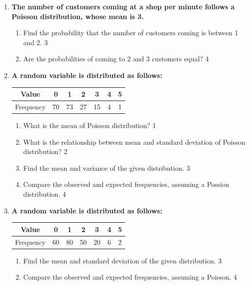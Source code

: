 \documentclass[a4paper,oneside, margin=1.4in]{book}
\begin{document}
\begin{enumerate}
  
  \item
	  \textbf{The number of customers coming at a shop per minute follows a 
	  Poisson distribution,  whose mean is 3.} 
  
  \begin{enumerate}

    \item  
	Find the probability that the number of customers coming is between 1 and 2. \hfill 3
    \item
	Are the probabilities of coming to 2 and 3 customers equal?  \hfill 4
  \end{enumerate}

 \item
	  \textbf{A random variable is distributed as follows:} 
	  
	  \begin{table}[h]
	  \centering
\begin{tabular}{c|c|c|c|c|c|c}
Value & 0 & 1 & 2 & 3 & 4 & 5 \\ \hline
Frequency & 70 & 73 & 27 & 15 & 4 & 1
\end{tabular}
\end{table}
  
  \begin{enumerate}
    \item
	What is the mean of Poisson distribution? \hfill 1
    \item
	What is the relationship between mean and standard deviation of Poisson 
	distribution? \hfill 2
    \item  
	Find the mean and variance of the given distribution. \hfill 3
    \item
	Compare the observed and expected frequencies, assuming a Possion 
	distribution. \hfill 4
  \end{enumerate}
  
  \item  
\textbf{A random variable is distributed as follows:}  

\begin{table}[h]
\centering
\begin{tabular}{c|c|c|c|c|c|c}
Value & 0 & 1 & 2 & 3 & 4 & 5 \\ \hline
Frequency & 60 & 80 & 50 & 20 & 6 & 2
\end{tabular}
\end{table}

\begin{enumerate}
    \item  
    Find the mean and standard deviation of the given distribution. \hfill 3
    \item  
    Compare the observed and expected frequencies, assuming a Poisson. \hfill 4
\end{enumerate}


  \end{enumerate}
\end{document}
